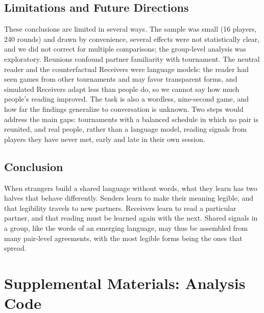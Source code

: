 \documentclass[stu,11pt,floatsintext,donotrepeattitle]{apa7}
\begin{document}
\subsection{Limitations and Future Directions}

These conclusions are limited in several ways. The sample was small (16 players, 240 rounds) and drawn by convenience, several effects were not statistically clear, and we did not correct for multiple comparisons; the group-level analysis was exploratory. Reunions confound partner familiarity with tournament. The neutral reader and the counterfactual Receivers were language models: the reader had seen games from other tournaments and may favor transparent forms, and simulated Receivers adapt less than people do, so we cannot say how much people's reading improved. The task is also a wordless, nine-second game, and how far the findings generalize to conversation is unknown. Two steps would address the main gaps: tournaments with a balanced schedule in which no pair is reunited, and real people, rather than a language model, reading signals from players they have never met, early and late in their own session.

\subsection{Conclusion}

When strangers build a shared language without words, what they learn has two halves that behave differently. Senders learn to make their meaning legible, and that legibility travels to new partners. Receivers learn to read a particular partner, and that reading must be learned again with the next. Shared signals in a group, like the words of an emerging language, may thus be assembled from many pair-level agreements, with the most legible forms being the ones that spread.

\printbibliography

\appendix
\section{Supplemental Materials: Analysis Code}
\end{document}
